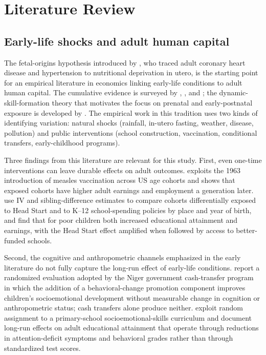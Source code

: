 
\section{Literature Review} \label{sec:literature}

\subsection{Early-life shocks and adult human capital}

The fetal-origins hypothesis introduced by \textcite{barker1995}, who traced adult coronary heart disease and hypertension to nutritional deprivation in utero, is the starting point for an empirical literature in economics linking early-life conditions to adult human capital. The cumulative evidence is surveyed by \textcite{almondcurrie2011}, \textcite{almondmazumder2013}, and \textcite{currievogl2013}; the dynamic-skill-formation theory that motivates the focus on prenatal and early-postnatal exposure is developed by \textcite{cunhaheckman2007}. The empirical work in this tradition uses two kinds of identifying variation: natural shocks (rainfall, in-utero fasting, weather, disease, pollution) and public interventions (school construction, vaccination, conditional transfers, early-childhood programs).

Three findings from this literature are relevant for this study. First, even one-time interventions can leave durable effects on adult outcomes. \textcite{atwood2022} exploits the 1963 introduction of measles vaccination across US age cohorts and shows that exposed cohorts have higher adult earnings and employment a generation later. \textcite{johnson2019} use IV and sibling-difference estimates to compare cohorts differentially exposed to Head Start and to K--12 school-spending policies by place and year of birth, and find that for poor children both increased educational attainment and earnings, with the Head Start effect amplified when followed by access to better-funded schools.

Second, the cognitive and anthropometric channels emphasized in the early literature do not fully capture the long-run effect of early-life conditions. \textcite{premand2022} report a randomized evaluation adopted by the Niger government cash-transfer program in which the addition of a behavioral-change promotion component improves children's socioemotional development without measurable change in cognition or anthropometric status; cash transfers alone produce neither. \textcite{sorrenti2025} exploit random assignment to a primary-school socioemotional-skills curriculum and document long-run effects on adult educational attainment that operate through reductions in attention-deficit symptoms and behavioral grades rather than through standardized test scores.

